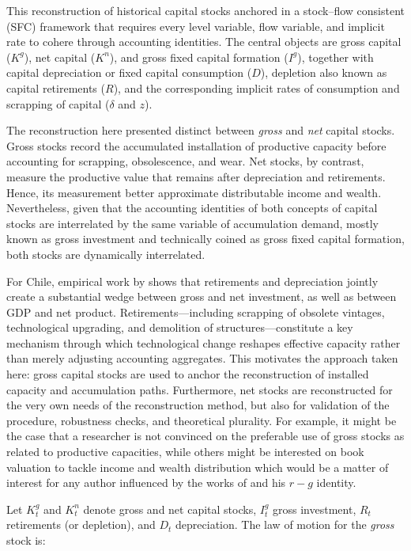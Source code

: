 \documentclass[11pt,a4paper]{article}
\begin{document}
This reconstruction of historical capital stocks anchored in a stock--flow consistent (SFC) framework that requires every level variable, flow variable, and implicit rate to cohere through accounting identities. The central objects are gross capital ($K^g$), net capital ($K^n$), and gross fixed capital formation ($I^g$), together with capital depreciation or fixed capital consumption ($D$), depletion also known as capital retirements ($R$), and the corresponding implicit rates of consumption and scrapping of capital ($\delta$ and $z$). 

The reconstruction here presented distinct between \emph{gross} and \emph{net} capital stocks. Gross stocks record the accumulated installation of productive capacity before accounting for scrapping, obsolescence, and wear. Net stocks, by contrast, measure the productive value that remains after depreciation and retirements. Hence, its measurement better approximate distributable income and wealth. Nevertheless, given that the accounting identities of both concepts of capital stocks are interrelated by the same variable of accumulation demand, mostly known as gross investment and technically coined as gross fixed capital formation, both stocks are dynamically interrelated. 

For Chile, empirical work by \citet{Ffrench2016} shows that retirements and depreciation jointly create a substantial wedge between gross and net investment, as well as between GDP and net product. Retirements---including scrapping of obsolete vintages, technological upgrading, and demolition of structures---constitute a key mechanism through which technological change reshapes effective capacity rather than merely adjusting accounting aggregates. This motivates the approach taken here: gross capital stocks are used to anchor the reconstruction of installed capacity and accumulation paths. Furthermore, net stocks are reconstructed for the very own needs of the reconstruction method, but also for validation of the procedure, robustness checks, and theoretical plurality. For example, it might be the case that a researcher is not convinced on the preferable use of gross stocks as related to productive capacities, while others might be interested on book valuation to tackle income and wealth distribution which would be a matter of interest for any author influenced by the works of \citet{Piketty2014} and his $r-g$ identity. 

Let $K^{g}_{t}$ and $K^{n}_{t}$ denote gross and net capital stocks, $I^{g}_{t}$ gross investment, $R_{t}$ retirements (or depletion), and $D_{t}$ depreciation. The law of motion for the \emph{gross} stock is:
\end{document}
